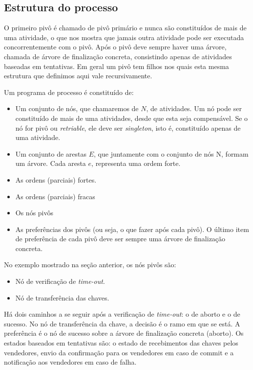 \documentclass[a4paper,12pt,notitlepage]{article}
\begin{document}
\subsection{Estrutura do processo}

O primeiro pivô é chamado de pivô primário e nunca são constituídos de mais de uma atividade, o que nos mostra que jamais outra atividade pode ser executada concorrentemente com o pivô. Após o pivô deve sempre haver uma árvore, chamada de árvore de finalização concreta, consistindo apenas de atividades baseadas em tentativas. Em geral um pivô tem filhos nos quais esta mesma estrutura que definimos aqui vale recursivamente. 

Um programa de processo é constituído de:
\begin{itemize}
  \item Um conjunto de nós, que chamaremos de $N$, de atividades. Um nó pode ser constituído de mais de uma atividades, desde que esta seja compensável. Se o nó for pivô ou \textit{retriable}, ele deve ser \textit{singleton}, isto é, constituído apenas de uma atividade.
  \item Um conjunto de arestas $E$, que juntamente com o conjunto de nós N, formam um árvore. Cada aresta $e$, representa uma ordem forte.
  \item As ordens (parciais) fortes.
  \item As ordens (parciais) fracas
  \item Os nós pivôs
  \item As preferências dos pivôs (ou seja, o que fazer após cada pivô). O último item de preferência de cada pivô deve ser sempre uma árvore de finalização concreta.
\end{itemize}
  
No exemplo mostrado na seção anterior, os nós pivôs são: 
\begin{itemize}  
  \item Nó de verificação de \textit{time-out}. 
  \item Nó de transferência das chaves.
\end{itemize}

Há dois caminhos a se seguir após a verificação de \textit{time-out}: o de aborto e o de sucesso. No nó de transferência da chave, a decisão é o ramo em que se está. A preferência é o nó de sucesso sobre a árvore 
de finalização concreta (aborto). Os estados baseados em tentativas são: o estado de recebimentos das chaves pelos vendedores, envio da confirmação para os vendedores em caso de commit e a notificação aos vendedores em caso de falha. 
\end{document}

